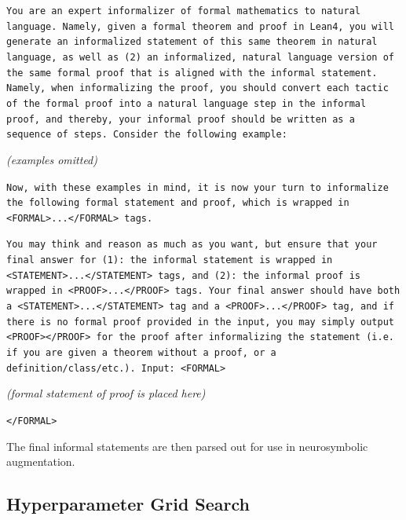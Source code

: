 \tiny\texttt{You are an expert informalizer of formal mathematics to natural language. Namely, given a formal theorem and proof in Lean4,
you will generate an informalized statement of this same theorem in natural language, as well as (2) an informalized, natural language version of the same formal proof
that is aligned with the informal statement. Namely, when informalizing the proof, you should convert each tactic of the formal proof into a natural language step in the informal proof, and thereby, your informal proof should be written as a sequence of steps. Consider the following example:}

\textit{(examples omitted)}

\tiny\texttt{Now, with these examples in mind, it is now your turn to informalize the following formal statement and proof, which is wrapped in <FORMAL>...</FORMAL> tags.}

\tiny\texttt{You may think and reason as much as you want, but ensure that your final answer for (1): the informal statement is wrapped in <STATEMENT>...</STATEMENT> tags, and (2): the informal proof is wrapped in <PROOF>...</PROOF> tags.
Your final answer should have both a <STATEMENT>...</STATEMENT> tag and a <PROOF>...</PROOF> tag, and if there is no formal proof provided in the input, you may simply output <PROOF></PROOF> for the proof after informalizing the statement (i.e. if you are given a theorem without a proof, or a definition/class/etc.).
Input:
<FORMAL>}

\textit{(formal statement of proof is placed here)}

\tiny\texttt{</FORMAL>}

\normalsize The final informal statements are then parsed out for use in neurosymbolic augmentation. 



\subsection{Hyperparameter Grid Search}

